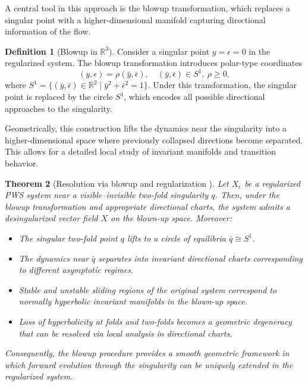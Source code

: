 \documentclass[12pt, a4paper, oneside]{book}
\theoremstyle{plain}
\newtheorem{theorem}{Theorem}[chapter]
\theoremstyle{definition}
\newtheorem{definition}[theorem]{Definition}
\theoremstyle{remark}
\theoremstyle{definition}
\begin{document}
A central tool in this approach is the blowup transformation, which replaces a singular point with a higher-dimensional manifold capturing directional information of the flow.

\begin{definition}[Blowup in $\mathbb{R}^3$]
Consider a singular point $y=\epsilon=0$ in the regularized system. The blowup transformation introduces polar-type coordinates
\[
(y,\epsilon) = \rho(\bar{y}, \bar{\epsilon}), \quad (\bar{y},\bar{\epsilon}) \in S^1, \ \rho \geq 0,
\]
where $S^1 = \{(\bar{y},\bar{\epsilon}) \in \mathbb{R}^2 \mid \bar{y}^2 + \bar{\epsilon}^2 = 1\}$. Under this transformation, the singular point is replaced by the circle $S^1$, which encodes all possible directional approaches to the singularity.
\end{definition}

Geometrically, this construction lifts the dynamics near the singularity into a higher-dimensional space where previously collapsed directions become separated. This allows for a detailed local study of invariant manifolds and transition behavior.

\begin{theorem}[Resolution via blowup and regularization \cite{kristiansen2019resolution}]
Let $X_\epsilon$ be a regularized PWS system near a visible–invisible two-fold singularity $q$. Then, under the blowup transformation and appropriate directional charts, the system admits a desingularized vector field $X$ on the blown-up space. Moreover:

\begin{itemize}
    \item The singular two-fold point $q$ lifts to a circle of equilibria $\bar{q} \cong S^1$.
    \item The dynamics near $\bar{q}$ separates into invariant directional charts corresponding to different asymptotic regimes.
    \item Stable and unstable sliding regions of the original system correspond to normally hyperbolic invariant manifolds in the blown-up space.
    \item Loss of hyperbolicity at folds and two-folds becomes a geometric degeneracy that can be resolved via local analysis in directional charts.
\end{itemize}

Consequently, the blowup procedure provides a smooth geometric framework in which forward evolution through the singularity can be uniquely extended in the regularized system.
\end{theorem}
\end{document}

